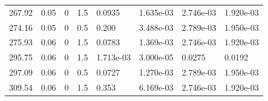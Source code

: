 \documentclass[preview]{standalone}
\begin{document}
{{\begin{tabular}{L{1.2cm}C{1.2cm} C{0.3cm}C{0.5cm} C{1.4cm}C{1.4cm} C{1.4cm}C{1.4cm}}
  267.92  &  0.05  & 0     & 1.5 &  0.0935  & 1.635e-03  & 2.746e-03 &  1.920e-03   \\ 
  274.16  &  0.05  & 0     & 0.5 &  0.200  & 3.488e-03  & 2.789e-03 &  1.950e-03   \\ 
  275.93  &  0.06  & 0     & 1.5 &  0.0783  & 1.369e-03  & 2.746e-03 &  1.920e-03   \\ 
  295.75  &  0.06  & 0     & 1.5 &  1.713e-03  & 3.000e-05  & 0.0275 &  0.0192   \\ 
  297.09  &  0.06  & 0     & 0.5 &  0.0727  & 1.270e-03  & 2.789e-03 &  1.950e-03   \\ 
  309.54  &  0.06  & 0     & 1.5 &  0.353  & 6.169e-03  & 2.746e-03 &  1.920e-03   \\ 
\hline 
\end{tabular} 

}}
\end{document}
